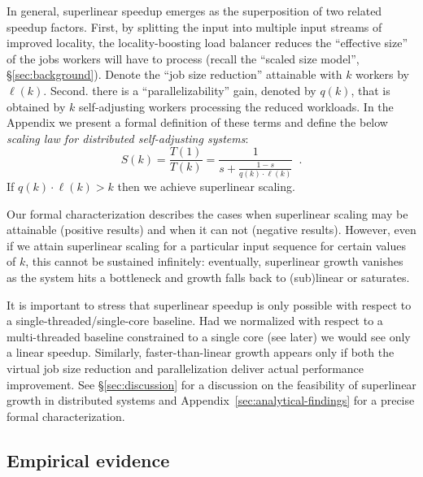 In general, superlinear speedup emerges as the superposition of two related speedup factors. First, by splitting the input into multiple input streams of improved locality, the locality-boosting load balancer reduces the ``effective size'' of the jobs workers will have to process (recall the ``scaled size model'', \S\ref{sec:background}). Denote the ``job size reduction'' attainable with $k$ workers by $\ell(k)$. Second. there is a ``parallelizability'' gain, denoted by $q(k)$, that is obtained by $k$ self-adjusting workers processing the reduced workloads.  In the Appendix we present a formal definition of these terms and define the below \emph{scaling law for distributed self-adjusting systems}:
\begin{displaymath}
    S(k) = \frac{T(1)}{T(k)} = \frac{1}{s + \frac{1-s}{q(k) \cdot \ell(k)}} \enspace .
\end{displaymath}
If $q(k) \cdot \ell(k) > k$ then we achieve superlinear scaling.

Our formal characterization describes the cases when superlinear scaling may be attainable (positive results) and when it can not (negative results). However, even if we attain superlinear scaling for a particular input sequence for certain values of $k$, this cannot be sustained infinitely: eventually, superlinear growth vanishes as the system hits a bottleneck and growth falls back to (sub)linear or saturates.

It is important to stress that superlinear speedup is only possible with respect to a single-threaded\slash single-core baseline. Had we normalized with respect to a multi-threaded baseline constrained to a single core (see later) we would see only a linear speedup. Similarly, faster-than-linear growth appears only if both the virtual job size reduction and parallelization deliver actual performance improvement. See \S\ref{sec:discussion} for a discussion on the feasibility of superlinear growth in distributed systems and Appendix~\ref{sec:analytical-findings} for a precise formal characterization.


\subsection{Empirical evidence}
\label{sec:sims}

